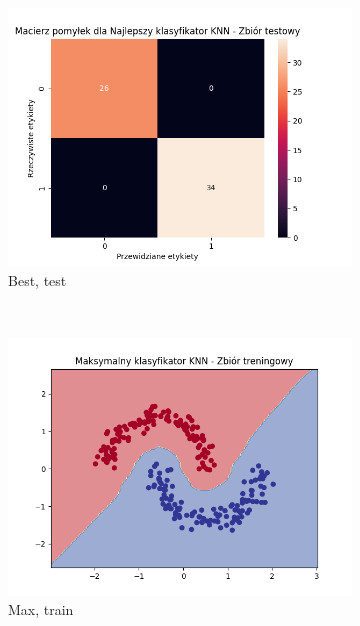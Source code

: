 \documentclass[12pt]{article}
\newcommand*{\subfigwidth}{0.24\textwidth}
\begin{document}
\begin{figure}[H]
\begin{subfigure}[t]{\subfigwidth}
        \includegraphics[width=\linewidth]{img/exp_2/knn/2_2/best/test_matrix.png}
        \caption{Best, test}
    \end{subfigure} 
    \\
    \begin{subfigure}[t]{\subfigwidth}
        \includegraphics[width=\linewidth]{img/exp_2/knn/2_2/max/train_boundary.png}
        \caption{Max, train}
    \end{subfigure}
    \hfill
    \begin{subfigure}[t]{\subfigwidth}

\end{subfigure}
\end{figure}
\end{document}
